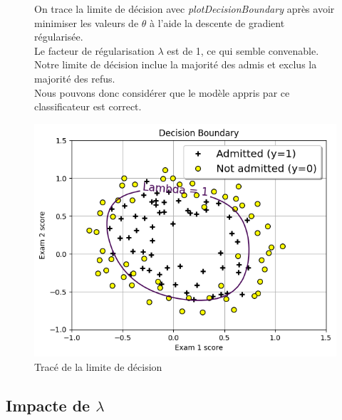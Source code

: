 \begin{figure}[!h]
    \begin{minipage}{.48\linewidth}
       On trace la limite de décision avec \textit{plotDecisionBoundary} après avoir minimiser les valeurs de $\theta$ à l'aide la descente de gradient régularisée. \\
       Le facteur de régularisation $\lambda$ est de 1, ce qui semble convenable. Notre limite de décision inclue la majorité des admis et exclus la majorité des refus. \\

       Nous pouvons donc considérer que le modèle appris par ce classificateur est correct.

    \end{minipage}\hfill
    \begin{minipage}{.48\linewidth}
        \begin{center}
            \includegraphics[width=1\textwidth]{./img/4.4.png}
            \caption{\label{fig:4.4}Tracé de la limite de décision}  
        \end{center}
    \end{minipage}
\end{figure}


\subsection{Impacte de $\lambda$}

